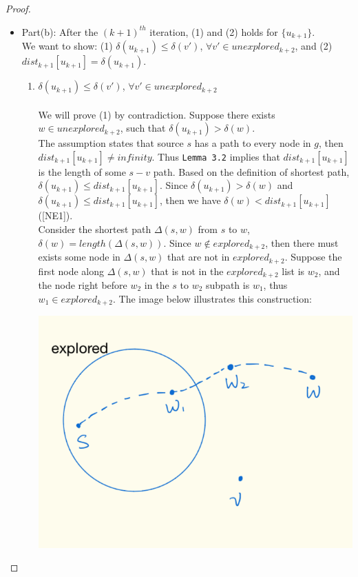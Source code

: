 \documentclass[11pt, oneside]{article}   	%
\theoremstyle{definition}
\begin{document}
\begin{proof}
\begin{itemize}
  \item Part(b): After the $(k+1)^{th}$ iteration, (1) and (2) holds for $\{u_{k+1}\}$. 
  \\
  We want to show: (1) $\delta(u_{k+1}) \leq \delta(v')$, $\forall v' \in unexplored_{k+2}$, and (2) $dist_{k+1}[u_{k+1}] = \delta(u_{k+1})$. 
  \begin{enumerate}
  \item $\delta(u_{k+1}) \leq \delta(v')$, $\forall v' \in unexplored_{k+2}$
  \\\\
  We will prove (1) by contradiction. Suppose there exists $w \in unexplored_{k+2}$, such that $\delta(u_{k+1}) > \delta(w)$. 
  \\
  The assumption states that source $s$ has a path to every node in $g$, then $dist_{k+1}[u_{k+1}] \neq infinity$. Thus \texttt{Lemma 3.2} implies that $dist_{k+1}[u_{k+1}]$ is the length of some $s-v$ path. Based on the definition of shortest path, $\delta(u_{k+1}) \leq dist_{k+1}[u_{k+1}]$. Since $\delta(u_{k+1}) > \delta(w)$ and $\delta(u_{k+1}) \leq dist_{k+1}[u_{k+1}]$, then we have $\delta(w) < dist_{k+1}[u_{k+1}]$([NE1]). 
  \\
  Consider the shortest path $\Delta(s, w)$ from $s$ to $w$, $\delta(w) = length(\Delta(s, w))$. Since $w \notin explored_{k+2}$, then there must exists some node in $\Delta(s, w)$ that are not in $explored_{k+2}$. Suppose the first node along $\Delta(s, w)$ that is not in the $explored_{k+2}$ list is $w_2$, and the node right before $w_2$ in the $s$ to $w_2$ subpath is $w_1$, thus $w_1 \in explored_{k+2}$. The image below illustrates this construction: 
  \\
  \begin{center}
  \includegraphics[scale = 0.35]{p1.png}

\end{center}
\end{enumerate}
\end{itemize}
\end{proof}
\end{document}
